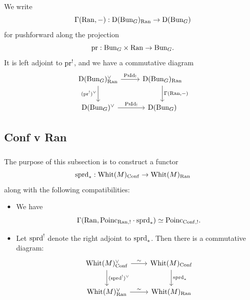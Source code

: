\subsubsection{} We write
    \[\Gamma(\mathrm{Ran}, -) : \mathrm{D}(\mathrm{Bun}_G)_{\mathrm{Ran}} \to \mathrm{D}(\mathrm{Bun}_G)\]
for pushforward along the projection
    \[\mathrm{pr} : \mathrm{Bun}_G \times \mathrm{Ran} \to \mathrm{Bun}_G.\]
It is left adjoint to $\mathrm{pr}^!$, and we have a commutative diagram
\[
\begin{tikzcd}[
      column sep={9em,between origins},
      row sep={4em,between origins}
    ]
    \DMod(\Bun_G)_\Ran^\vee \arrow[r, "\PsId_!"] \arrow[d, "(\pr^!)^\vee" left] & \DMod(\Bun_G)_\Ran \arrow[d, "{\Gamma(\Ran,-)}"] \\
    \DMod(\Bun_G)^\vee \arrow[r, "\PsId_!"] & \DMod(\Bun_G)
\end{tikzcd}
\]

\subsection{Conf v Ran}

\subsubsection{} The purpose of this subsection is to construct a functor
    \[\mathrm{sprd}_* : \mathrm{Whit}(M)_{\mathrm{Conf}} \to \mathrm{Whit}(M)_{\mathrm{Ran}}\]
along with the following compatibilities:
\begin{itemize}
    \item We have
        \begin{equation}
        \label{eqn:Poinc_Ran_sprd}
        \Gamma(\mathrm{Ran}, \mathrm{Poinc}_{\mathrm{Ran},!} \cdot \mathrm{sprd}_*) \simeq \mathrm{Poinc}_{\mathrm{Conf}, !}.
        \end{equation}
    \item Let $\mathrm{sprd}^!$ denote the right adjoint to $\mathrm{sprd}_*$. Then there is a commutative diagram:
    \begin{equation}
    \label{eqn:sprd_duality}
    \begin{tikzcd}[
      column sep={9em,between origins},
      row sep={4em,between origins}
    ]
      \Whit(M)_\Conf^\vee \arrow[r, "\sim"] \arrow[d, "(\sprd^!)^\vee"] & \Whit(M)_\Conf \arrow[d, "\sprd_*"] \\
      \Whit(M)_\Ran^\vee \arrow[r, "\sim"] & \Whit(M)_\Ran
    \end{tikzcd}
    \end{equation}
\end{itemize}

